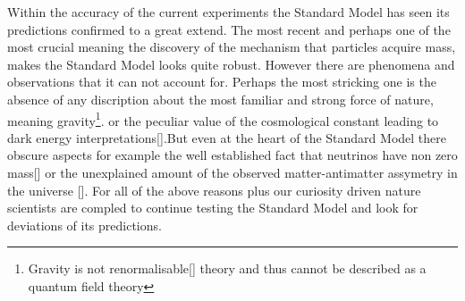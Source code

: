 
Within the accuracy of the current experiments the Standard Model has seen its predictions confirmed to a great extend.
The most recent and perhaps one of the most crucial meaning the discovery of the mechanism that particles acquire mass, makes the Standard
Model looks quite robust. However there are phenomena and observations that it can not account for. Perhaps the most stricking one is the
absence of any discription about the most familiar and strong force of nature, meaning gravity\footnote{Gravity is not renormalisable[\cite{}]
theory and thus cannot be described as a quantum field theory}. or the peculiar value of the cosmological constant leading to dark energy
interpretations[\cite{}].But even at the heart of the Standard Model there obscure aspects for example the well established fact that neutrinos
have non zero mass[\cite{}] or the unexplained amount of the observed matter-antimatter assymetry in the universe [\cite{}]. For all of the
above reasons plus our curiosity driven nature scientists are compled to continue testing the Standard Model and look for deviations of
its predictions.
